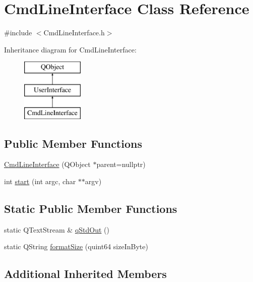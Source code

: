 \hypertarget{class_cmd_line_interface}{}\section{Cmd\+Line\+Interface Class Reference}
\label{class_cmd_line_interface}


{\ttfamily \#include $<$Cmd\+Line\+Interface.\+h$>$}

Inheritance diagram for Cmd\+Line\+Interface\+:\begin{figure}[H]
\begin{center}
\leavevmode
\includegraphics[height=3.000000cm]{class_cmd_line_interface}
\end{center}
\end{figure}
\subsection*{Public Member Functions}
\begin{DoxyCompactItemize}
\item 
\hyperlink{class_cmd_line_interface_a11e8ca1ea05eef8aa33b228bcb0c1736}{Cmd\+Line\+Interface} (Q\+Object $\ast$parent=nullptr)
\item 
int \hyperlink{class_cmd_line_interface_af3b0b06d68e78c862e352b7f450c891e}{start} (int argc, char $\ast$$\ast$argv)
\end{DoxyCompactItemize}
\subsection*{Static Public Member Functions}
\begin{DoxyCompactItemize}
\item 
static Q\+Text\+Stream \& \hyperlink{class_cmd_line_interface_a35b2da2241002c6cd37937e01ee1e649}{q\+Std\+Out} ()
\item 
static Q\+String \hyperlink{class_cmd_line_interface_a2010385eacd9cec3dfa2daf26a0479fc}{format\+Size} (quint64 size\+In\+Byte)
\end{DoxyCompactItemize}
\subsection*{Additional Inherited Members}


